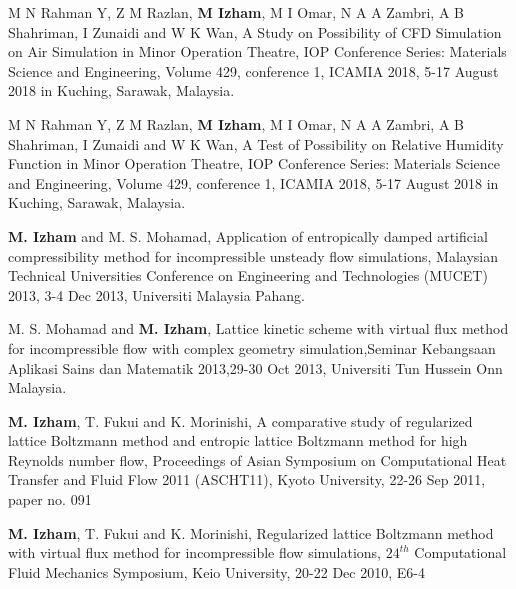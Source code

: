 \item M N Rahman Y, Z M Razlan, \textbf{M Izham}, M I Omar, N A A Zambri, A B Shahriman, I Zunaidi and W K Wan, A Study on Possibility of CFD Simulation on Air Simulation in Minor Operation Theatre, IOP Conference Series: Materials Science and Engineering, Volume 429, conference 1, ICAMIA 2018, 5-17 August 2018 in Kuching, Sarawak, Malaysia.

\item M N Rahman Y, Z M Razlan, \textbf{M Izham}, M I Omar, N A A Zambri, A B Shahriman, I Zunaidi and W K Wan, A Test of Possibility on Relative Humidity Function in Minor Operation Theatre, IOP Conference Series: Materials Science and Engineering, Volume 429, conference 1, ICAMIA 2018, 5-17 August 2018 in Kuching, Sarawak, Malaysia.

\item \textbf{M. Izham} and M. S. Mohamad, Application of entropically damped artificial compressibility method for incompressible unsteady flow simulations, Malaysian Technical Universities Conference on Engineering and Technologies (MUCET) 2013, 3-4 Dec 2013, Universiti Malaysia Pahang.

\item M. S. Mohamad and \textbf{M. Izham}, Lattice kinetic scheme with virtual flux method for incompressible flow with complex geometry simulation,Seminar Kebangsaan Aplikasi Sains dan Matematik 2013,29-30 Oct 2013, Universiti Tun Hussein Onn Malaysia.

\item \textbf{M. Izham}, T. Fukui and K. Morinishi, A comparative study of regularized lattice Boltzmann method and entropic lattice Boltzmann method for high Reynolds number flow, Proceedings of Asian Symposium on Computational Heat Transfer and Fluid Flow 2011 (ASCHT11), Kyoto University, 22-26 Sep 2011, paper no. 091

\item \textbf{M. Izham}, T. Fukui and K. Morinishi, Regularized lattice Boltzmann method with virtual flux method for incompressible flow simulations, $24^{th}$ Computational Fluid Mechanics Symposium, Keio University, 20-22 Dec 2010, E6-4
